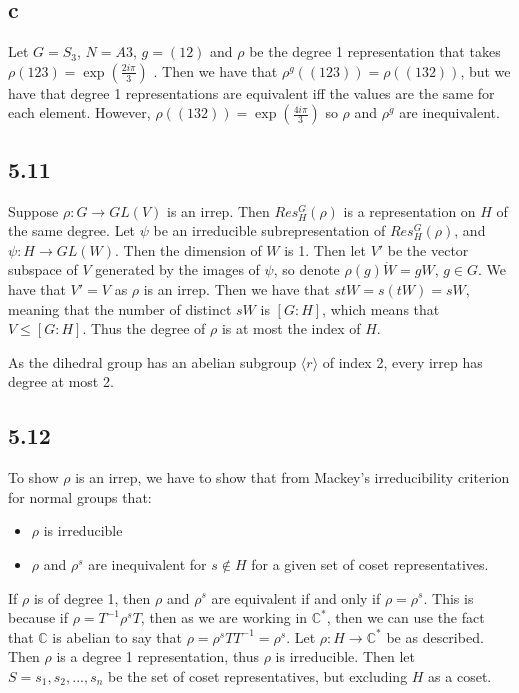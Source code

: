 \documentclass[]{article}
\begin{document}
\subsection*{c}
Let $G = S_3$, $N = A3$, $g = (12)$ and $\rho$ be the degree 1 representation that takes $\rho(123) = \exp(\frac{2 i \pi}{3})$ . Then we have that $\rho^g((123)) = \rho((132))$, but we have that degree 1 representations are equivalent iff the values are the same for each element. However, $\rho((132)) = \exp(\frac{4 i \pi}{3})$ so $\rho$ and $\rho^g$ are inequivalent. 

\subsection*{5.11}
Suppose $\rho: G \rightarrow GL(V)$ is an irrep. Then $Res^G_H(\rho)$ is a representation on $H$ of the same degree. Let $\psi$ be an irreducible subrepresentation of $Res^G_H(\rho)$, and $\psi: H \rightarrow GL(W)$. Then the dimension of $W$ is 1. Then let $V'$ be the vector subspace of $V$ generated by the images of $\psi$, so denote $\rho(g) \dot W = gW$, $g \in G$. We have that $V' = V$ as $\rho$ is an irrep. Then we have that $stW = s (tW) = sW$, meaning that the number of distinct $sW$ is $[G : H]$, which means that $V \leq [G : H]$. Thus the degree of $\rho$ is at most the index of $H$. 

As the dihedral group has an abelian subgroup $\langle r \rangle$ of index 2, every irrep has degree at most 2.

\subsection*{5.12}
To show $\rho$ is an irrep, we have to show that from Mackey's irreducibility criterion for normal groups that:
\begin{itemize}
	\item $\rho$ is irreducible
	\item $\rho$ and $\rho^s$ are inequivalent for $s \notin H$ for a given set of coset representatives.
\end{itemize}
If $\rho$ is of degree 1, then $\rho$ and $\rho^s$ are equivalent if and only if $\rho = \rho^s$. This is because if $\rho = T^{-1} \rho^s T$, then as we are working in $\mathbb{C}^*$, then we can use the fact that $\mathbb{C}$ is abelian to say that $\rho = \rho^s T T^{-1} = \rho^s$.   
Let $\rho : H \rightarrow \mathbb{C}^*$ be as described. Then $\rho$ is a degree 1 representation, thus $\rho$ is irreducible. Then let $S = {s_1, s_2, ..., s_n}$ be the set of coset representatives, but excluding $H$ as a coset.
\end{document}
